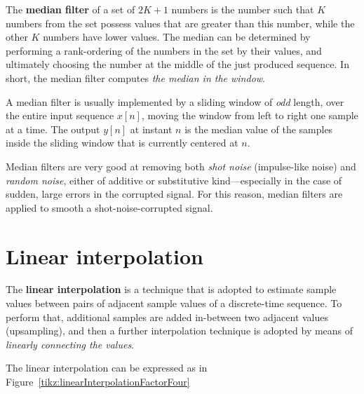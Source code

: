 \documentclass[\documentfontsize, twocolumn]{\classname}
\begin{document}
The \textbf{median filter} of a set of $2K+1$ numbers is the number such that $K$ numbers from the set possess values that are greater than this number, while the other $K$ numbers have lower values. The median can be determined by performing a rank-ordering of the numbers in the set by their values, and ultimately choosing the number at the middle of the just produced sequence. In short, the median filter computes \emph{the median in the window}.

A median filter is usually implemented by a sliding window of \emph{odd} length, over the entire input sequence $x[n]$, moving the window from left to right one sample at a time. The output $y[n]$ at instant $n$ is the median value of the samples inside the sliding window that is currently centered at $n$.

Median filters are very good at removing both \emph{shot noise} (impulse-like noise) and \emph{random noise}, either of additive or substitutive kind---especially in the case of sudden, large errors in the corrupted signal. For this reason, median filters are applied to smooth a shot-noise-corrupted signal.


\section{Linear interpolation}

The \textbf{linear interpolation} is a technique that is adopted to estimate sample values between pairs of adjacent sample values of a discrete-time sequence. To perform that, additional samples are added in-between two adjacent values (upsampling), and then a further interpolation technique is adopted by means of \emph{linearly connecting the values}. 

The linear interpolation can be expressed as in Figure~\ref{tikz:linearInterpolationFactorFour}
\end{document}
